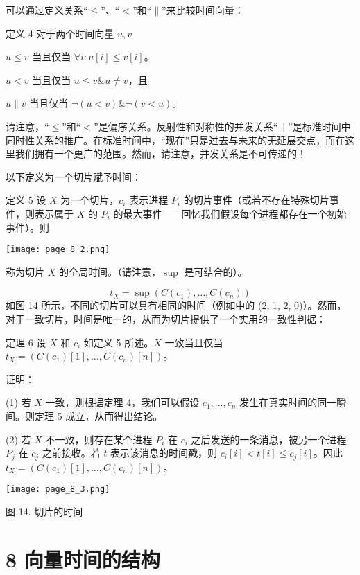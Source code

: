 \documentclass[12pt,a4paper]{report} %
\begin{document}
可以通过定义关系“$\leq$”、“$<$”和“$\|$”来比较时间向量：

定义 4 对于两个时间向量 $u, v$

$u \leq v$ 当且仅当 $\forall i: u[i] \leq v[i]$。

$u < v$ 当且仅当 $u \leq v \& u \neq v$，且

$u \| v$ 当且仅当 $\neg(u<v) \& \neg(v<u)$。

请注意，“$\leq$”和“$<$”是偏序关系。反射性和对称性的并发关系“$\|$”是标准时间中同时性关系的推广。在标准时间中，“现在”只是过去与未来的无延展交点，而在这里我们拥有一个更广的范围。然而，请注意，并发关系是不可传递的！

以下定义为一个切片赋予时间：

定义 5 设 $X$ 为一个切片，$c_i$ 表示进程 $P_i$ 的切片事件（或若不存在特殊切片事件，则表示属于 $X$ 的 $P_i$ 的最大事件——回忆我们假设每个进程都存在一个初始事件）。则

\begin{center}
\texttt{[image: page\_8\_2.png]}
\end{center}
\begin{center}
称为切片 $X$ 的全局时间。（请注意，$\sup$ 是可结合的）。
\end{center}$$t_{X}=\sup \left(C\left(c_{1}\right), \ldots, C\left(c_{n}\right)\right)$$ 如图 14 所示，不同的切片可以具有相同的时间（例如中的 (2, 1, 2, 0)）。然而，对于一致切片，时间是唯一的，从而为切片提供了一个实用的一致性判据：

定理 6 设 $X$ 和 $c_i$ 如定义 5 所述。$X$ 一致当且仅当 $t_{X}=\left(C\left(c_{1}\right)[1], \ldots, C\left(c_{n}\right)[n]\right)$。

证明：

(1) 若 $X$ 一致，则根据定理 4，我们可以假设 $c_1, \ldots, c_n$ 发生在真实时间的同一瞬间。则定理 5 成立，从而得出结论。

(2) 若 $X$ 不一致，则存在某个进程 $P_i$ 在 $c_i$ 之后发送的一条消息，被另一个进程 $P_j$ 在 $c_j$ 之前接收。若 $t$ 表示该消息的时间戳，则 $c_i[i] < t[i] \leq c_j[i]$。因此 $t_{X}=\left(C\left(c_{1}\right)[1], \ldots, C\left(c_{n}\right)[n]\right)$。

\begin{center}
\texttt{[image: page\_8\_3.png]}
\end{center}
\begin{center}
图 14. 切片的时间
\end{center}

\section*{8 向量时间的结构}
\end{document}
